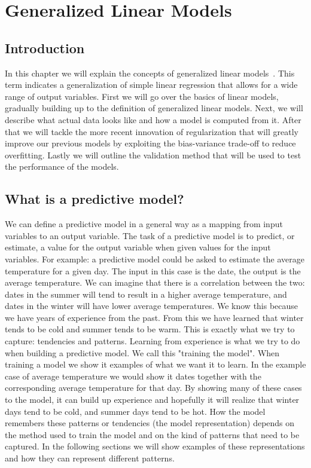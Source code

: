 \chapter{Generalized Linear Models}
\label{cha:glm}

\section{Introduction}
\label{sec:glm-introduction}
In this chapter we will explain the concepts of generalized linear models~\cite{caltechmachinelearning}\cite{wikiglm}. This term indicates a generalization of simple linear regression that allows for a wide range of output variables. First we will go over the basics of linear models, gradually building up to the definition of generalized linear models. Next, we will describe what actual data looks like and how a model is computed from it. After that we will tackle the more recent innovation of regularization that will greatly improve our previous models by exploiting the bias-variance trade-off to reduce overfitting. Lastly we will outline the validation method that will be used to test the performance of the models.

\section{What is a predictive model?}
\label{sec:glm-predictive-models}
We can define a predictive model in a general way as a mapping from input variables to an output variable. The task of a predictive model is to predict, or estimate, a value for the output variable when given values for the input variables. For example: a predictive model could be asked to estimate the average temperature for a given day. The input in this case is the date, the output is the average temperature. We can imagine that there is a correlation between the two: dates in the summer will tend to result in a higher average temperature, and dates in the winter will have lower average temperatures. We know this because we have years of experience from the past. From this we have learned that winter tends to be cold and summer tends to be warm. This is exactly what we try to capture: tendencies and patterns. Learning from experience is what we try to do when building a predictive model. We call this "training the model". When training a model we show it examples of what we want it to learn. In the example case of average temperature we would show it dates together with the corresponding average temperature for that day. By showing many of these cases to the model, it can build up experience and hopefully it will realize that winter days tend to be cold, and summer days tend to be hot. How the model remembers these patterns or tendencies (the model representation) depends on the method used to train the model and on the kind of patterns that need to be captured. In the following sections we will show examples of these representations and how they can represent different patterns.

